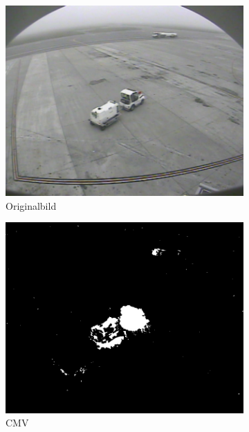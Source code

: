 \documentclass[]{scrartcl}
\begin{document}
\begin{figure}[h!]
\centering
\begin{subfigure}{.33\textwidth}
  \centering
  \includegraphics[width=.95\linewidth]{S21-2_0120.jpeg}
  \caption{Originalbild}
  \label{fig:comp_orig}
\end{subfigure}%
\begin{subfigure}{.33\textwidth}
  \centering
  \includegraphics[width=.95\linewidth]{Seg_S21-2_0120-CMV.jpeg}
  \caption{CMV}
  \label{fig:comp_cmv}
\end{subfigure}
\begin{subfigure}{.33\textwidth}
  \centering

\end{subfigure}
\end{figure}
\end{document}
